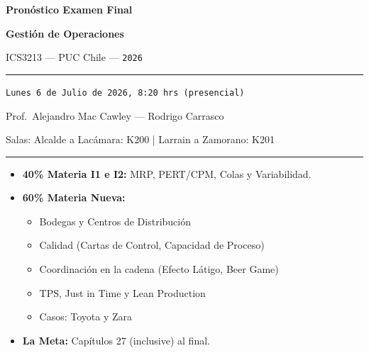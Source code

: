 \documentclass[11pt, a4paper]{article}
\begin{document}
\begin{titlepage}
  \centering
  \vspace*{2cm}
  {\Huge\bfseries\color{gopcyan} Pronóstico Examen Final\par}
  \vspace{0.4cm}
  {\LARGE\bfseries Gestión de Operaciones\par}
  \vspace{0.3cm}
  {\large ICS3213 --- PUC Chile --- \texttt{2026}\par}
  \vspace{1.2cm}
  \rule{\textwidth}{0.4pt}
  \vspace{0.4cm}

  {\normalsize \texttt{Lunes 6 de Julio de 2026, 8:20 hrs (presencial)}\par}
  \vspace{0.2cm}
  {\small Prof.\ Alejandro Mac Cawley --- Rodrigo Carrasco\par}
  \vspace{0.2cm}
  {\small Salas: Alcalde a Lacámara: K200 | Larrain a Zamorano: K201\par}
  \vspace{0.4cm}
  \rule{\textwidth}{0.4pt}
  \vspace{1cm}

  \begin{resumentemario}
    \begin{itemize}[leftmargin=1.2em, itemsep=2pt]
      \item \textbf{40\% Materia I1 e I2:} MRP, PERT/CPM, Colas y Variabilidad.
      \item \textbf{60\% Materia Nueva:}
      \begin{itemize}[leftmargin=1.2em, itemsep=1pt]
          \item Bodegas y Centros de Distribución
          \item Calidad (Cartas de Control, Capacidad de Proceso)
          \item Coordinación en la cadena (Efecto Látigo, Beer Game)
          \item TPS, Just in Time y Lean Production
          \item Casos: Toyota y Zara
      \end{itemize}
      \item \textbf{La Meta:} Capítulos 27 (inclusive) al final.
    \end{itemize}
  \end{resumentemario}


\end{titlepage}
\end{document}
